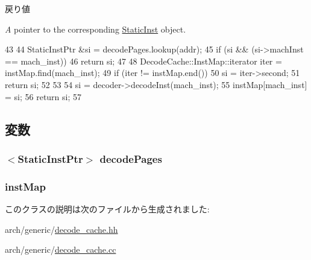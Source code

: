 \begin{DoxyRetVals}{戻り値}
\item[{\em A}]pointer to the corresponding \hyperlink{classStaticInst}{StaticInst} object. \end{DoxyRetVals}



\begin{DoxyCode}
43 {
44     StaticInstPtr &si = decodePages.lookup(addr);
45     if (si && (si->machInst == mach_inst))
46         return si;
47 
48     DecodeCache::InstMap::iterator iter = instMap.find(mach_inst);
49     if (iter != instMap.end()) {
50         si = iter->second;
51         return si;
52     }
53 
54     si = decoder->decodeInst(mach_inst);
55     instMap[mach_inst] = si;
56     return si;
57 }
\end{DoxyCode}


\subsection{変数}
\hypertarget{classGenericISA_1_1BasicDecodeCache_a2a8e058f871a2313b0b5b0e8094dbe40}{
\subsubsection[{decodePages}]{$<${\bf StaticInstPtr}$>$ {\bf decodePages}}}
\label{classGenericISA_1_1BasicDecodeCache_a2a8e058f871a2313b0b5b0e8094dbe40}
\hypertarget{classGenericISA_1_1BasicDecodeCache_abd0faa656234a0fd1a69ea9a2d61d154}{
\subsubsection[{instMap}]{ {\bf instMap}}}
\label{classGenericISA_1_1BasicDecodeCache_abd0faa656234a0fd1a69ea9a2d61d154}


このクラスの説明は次のファイルから生成されました:\begin{DoxyCompactItemize}
\item 
arch/generic/\hyperlink{arch_2generic_2decode__cache_8hh}{decode\_\-cache.hh}\item 
arch/generic/\hyperlink{decode__cache_8cc}{decode\_\-cache.cc}\end{DoxyCompactItemize}

